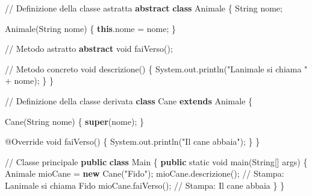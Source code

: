 \documentclass[
  letterpaper,
]{scrbook}
\newenvironment{Shaded}{\begin{snugshade}}{\end{snugshade}}
\newcommand{\AttributeTok}[1]{\textcolor[rgb]{0.40,0.45,0.13}{#1}}
\newcommand{\BuiltInTok}[1]{\textcolor[rgb]{0.00,0.23,0.31}{#1}}
\newcommand{\CommentTok}[1]{\textcolor[rgb]{0.37,0.37,0.37}{#1}}
\newcommand{\DataTypeTok}[1]{\textcolor[rgb]{0.68,0.00,0.00}{#1}}
\newcommand{\FunctionTok}[1]{\textcolor[rgb]{0.28,0.35,0.67}{#1}}
\newcommand{\KeywordTok}[1]{\textcolor[rgb]{0.00,0.23,0.31}{\textbf{#1}}}
\newcommand{\NormalTok}[1]{\textcolor[rgb]{0.00,0.23,0.31}{#1}}
\newcommand{\OperatorTok}[1]{\textcolor[rgb]{0.37,0.37,0.37}{#1}}
\newcommand{\StringTok}[1]{\textcolor[rgb]{0.13,0.47,0.30}{#1}}
\begin{document}
\begin{Shaded}
\begin{Highlighting}[]
\CommentTok{// Definizione della classe astratta}
\KeywordTok{abstract} \KeywordTok{class}\NormalTok{ Animale }\OperatorTok{\{}
    \BuiltInTok{String}\NormalTok{ nome}\OperatorTok{;}

    \FunctionTok{Animale}\OperatorTok{(}\BuiltInTok{String}\NormalTok{ nome}\OperatorTok{)} \OperatorTok{\{}
        \KeywordTok{this}\OperatorTok{.}\FunctionTok{nome} \OperatorTok{=}\NormalTok{ nome}\OperatorTok{;}
    \OperatorTok{\}}

    \CommentTok{// Metodo astratto}
    \KeywordTok{abstract} \DataTypeTok{void} \FunctionTok{faiVerso}\OperatorTok{();}

    \CommentTok{// Metodo concreto}
    \DataTypeTok{void} \FunctionTok{descrizione}\OperatorTok{()} \OperatorTok{\{}
        \BuiltInTok{System}\OperatorTok{.}\FunctionTok{out}\OperatorTok{.}\FunctionTok{println}\OperatorTok{(}\StringTok{"L\textquotesingle{}animale si chiama "} \OperatorTok{+}\NormalTok{ nome}\OperatorTok{);}
    \OperatorTok{\}}
\OperatorTok{\}}

\CommentTok{// Definizione della classe derivata}
\KeywordTok{class}\NormalTok{ Cane }\KeywordTok{extends}\NormalTok{ Animale }\OperatorTok{\{}

    \FunctionTok{Cane}\OperatorTok{(}\BuiltInTok{String}\NormalTok{ nome}\OperatorTok{)} \OperatorTok{\{}
        \KeywordTok{super}\OperatorTok{(}\NormalTok{nome}\OperatorTok{);}
    \OperatorTok{\}}

    \AttributeTok{@Override}
    \DataTypeTok{void} \FunctionTok{faiVerso}\OperatorTok{()} \OperatorTok{\{}
        \BuiltInTok{System}\OperatorTok{.}\FunctionTok{out}\OperatorTok{.}\FunctionTok{println}\OperatorTok{(}\StringTok{"Il cane abbaia"}\OperatorTok{);}
    \OperatorTok{\}}
\OperatorTok{\}}

\CommentTok{// Classe principale}
\KeywordTok{public} \KeywordTok{class}\NormalTok{ Main }\OperatorTok{\{}
    \KeywordTok{public} \DataTypeTok{static} \DataTypeTok{void} \FunctionTok{main}\OperatorTok{(}\BuiltInTok{String}\OperatorTok{[]}\NormalTok{ args}\OperatorTok{)} \OperatorTok{\{}
\NormalTok{        Animale mioCane }\OperatorTok{=} \KeywordTok{new} \FunctionTok{Cane}\OperatorTok{(}\StringTok{"Fido"}\OperatorTok{);}
\NormalTok{        mioCane}\OperatorTok{.}\FunctionTok{descrizione}\OperatorTok{();} \CommentTok{// Stampa: L\textquotesingle{}animale si chiama Fido}
\NormalTok{        mioCane}\OperatorTok{.}\FunctionTok{faiVerso}\OperatorTok{();}    \CommentTok{// Stampa: Il cane abbaia}
    \OperatorTok{\}}
\OperatorTok{\}}
\end{Highlighting}
\end{Shaded}
\end{document}

